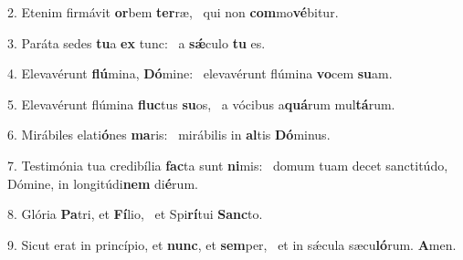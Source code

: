 2. Etenim firmávit \textbf{or}bem \textbf{ter}ræ, \ast\  qui non \textbf{com}mo\textbf{vé}bitur.\

3. Paráta sedes \textbf{tu}a \textbf{ex} tunc: \ast\  a \textbf{sǽ}culo \textbf{tu} es.\

4. Elevavérunt \textbf{flú}mina, \textbf{Dó}mine: \ast\  elevavérunt flúmina \textbf{vo}cem \textbf{su}am.\

5. Elevavérunt flúmina \textbf{fluc}tus \textbf{su}os, \ast\  a vócibus a\textbf{quá}rum mul\textbf{tá}rum.\

6. Mirábiles elati\textbf{ó}nes \textbf{ma}ris: \ast\  mirábilis in \textbf{al}tis \textbf{Dó}minus.\

7. Testimónia tua credibília \textbf{fac}ta sunt \textbf{ni}mis: \ast\  domum tuam decet sanctitúdo, Dómine, in longitúdi\textbf{nem} di\textbf{é}rum.\

8. Glória \textbf{Pa}tri, et \textbf{Fí}lio, \ast\  et Spi\textbf{rí}tui \textbf{Sanc}to.\

9. Sicut erat in princípio, et \textbf{nunc}, et \textbf{sem}per, \ast\  et in sǽcula sæcu\textbf{ló}rum. \textbf{A}men.\

